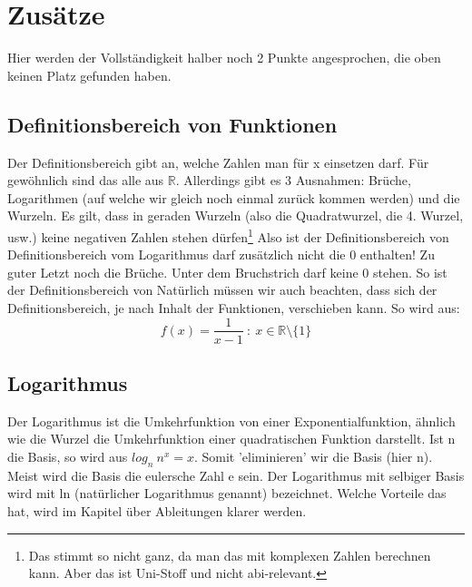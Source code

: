 \section{Zusätze}
	Hier werden der Vollständigkeit halber noch 2 Punkte angesprochen, die oben
	keinen Platz gefunden haben.

	\subsection{Definitionsbereich von Funktionen}
		Der Definitionsbereich gibt an, welche Zahlen man für x einsetzen darf. Für
		gewöhnlich sind das alle aus \(\mathbb{R}\). Allerdings gibt es 3 Ausnahmen:
		Brüche, Logarithmen (auf welche wir gleich noch einmal zurück kommen werden)
		und die Wurzeln. Es gilt, dass in geraden Wurzeln (also die Quadratwurzel, die
		4. Wurzel, usw.) keine negativen Zahlen stehen dürfen\footnote{Das stimmt so
		nicht ganz, da man das mit komplexen Zahlen berechnen kann. Aber das ist
		Uni-Stoff und nicht abi-relevant.} Also ist der Definitionsbereich von
		\formel{\[f(x)=\sqrt{x}\ :\ x\geq 0\]}
		Definitionsbereich vom Logarithmus darf	zusätzlich nicht die 0 enthalten!
		\formel{\[f(x)=ln(x)\ :\ x>0\]}
		Zu guter Letzt noch die Brüche. Unter dem Bruchstrich darf keine 0 stehen. So
		ist der Definitionsbereich von
		\formel{\[f(x)=\frac{1}{x}\ :\ x\in\mathbb{R}\setminus\{0\}\]}
		Natürlich müssen wir auch beachten, dass sich der Definitionsbereich, je nach
		Inhalt der Funktionen, verschieben kann. So wird aus:
		\[f(x)=\frac{1}{x-1}\ :\ x\in\mathbb{R}\setminus\{1\}\]
	
	\subsection{Logarithmus}
		Der Logarithmus ist die Umkehrfunktion von einer Exponentialfunktion, ähnlich
		wie die Wurzel die Umkehrfunktion einer quadratischen Funktion darstellt. Ist
		n die Basis, so wird aus \(log_n\ n^x=x\). Somit 'eliminieren' wir die Basis
		(hier n). Meist wird die Basis die eulersche Zahl e sein. Der Logarithmus mit
		selbiger Basis wird mit ln (natürlicher Logarithmus genannt) bezeichnet.
		Welche Vorteile das hat, wird im Kapitel über Ableitungen klarer werden.
